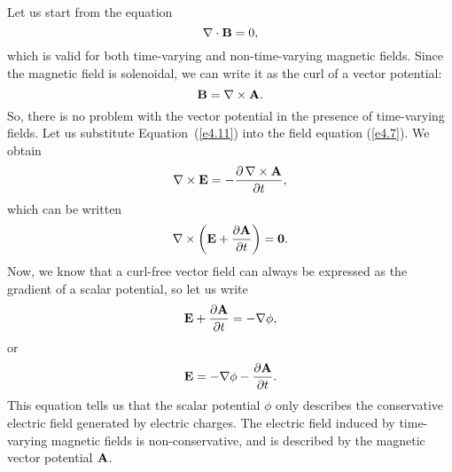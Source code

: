 Let us start from the  equation
\begin{equation}
\nabla \cdot {\bf B} = 0,
\end{equation}
which is valid for both time-varying and non-time-varying magnetic fields. Since the
magnetic field is solenoidal, we can write it as the curl of a vector potential:
\begin{equation}\label{e4.11}
{\bf B} = \nabla\times{\bf A}.
\end{equation}
So, there is no problem with the vector potential in the presence of time-varying fields. Let us substitute Equation~(\ref{e4.11}) into the field equation (\ref{e4.7}).
We obtain
\begin{equation}
\nabla\times{\bf E} = - \frac{\partial \,\nabla\times{\bf A}}{\partial t},
\end{equation}
which can be written
\begin{equation}
\nabla\times\left( {\bf E} + \frac{\partial {\bf A} }{\partial t} \right) ={\bf 0}.
\end{equation}
Now, we know that a curl-free vector field can always be expressed as the gradient of
a scalar potential, so let us write
\begin{equation}
{\bf E} + \frac{\partial {\bf A} }{\partial t} = -\nabla\phi,
\end{equation}
or
\begin{equation}
{\bf E} = - \nabla\phi - \frac{\partial {\bf A} }{\partial t}.
\end{equation}
This  equation tells us that the scalar potential $\phi$ only
describes the conservative electric field generated by electric charges. 
The electric field induced by time-varying magnetic fields is non-conservative, and
is described by the magnetic vector potential ${\bf A}$.


